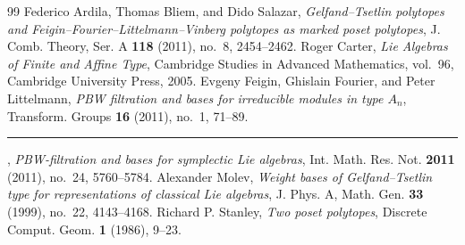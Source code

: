 \begin{thebibliography}{99}
 Federico Ardila, Thomas Bliem, and Dido Salazar,
\emph{Gelfand--Tsetlin polytopes and Feigin--Fourier--Littelmann--Vinberg polytopes as marked poset polytopes},
J. Comb. Theory, Ser. A \textbf{118} (2011), no.~8, 2454--2462.
 Roger Carter, \emph{Lie Algebras of Finite and Affine Type},
Cambridge Studies in Advanced Mathematics, vol.~96, Cambridge University Press, 2005.
 Evgeny Feigin, Ghislain Fourier, and Peter Littelmann,
\emph{PBW filtration and bases for irreducible modules in type $A_n$},
Transform. Groups \textbf{16} (2011), no.~1, 71--89.
 \rule[0.5ex]{2em}{0.4pt},
\emph{PBW-filtration and bases for symplectic Lie algebras},
Int. Math. Res. Not. \textbf{2011} (2011), no.~24, 5760--5784.
 Alexander Molev,
\emph{Weight bases of Gelfand--Tsetlin type for representations of classical Lie algebras},
J. Phys. A, Math. Gen. \textbf{33} (1999), no.~22, 4143--4168.
 Richard P. Stanley, \emph{Two poset polytopes},
Discrete Comput. Geom. \textbf{1} (1986), 9--23.
\end{thebibliography}
